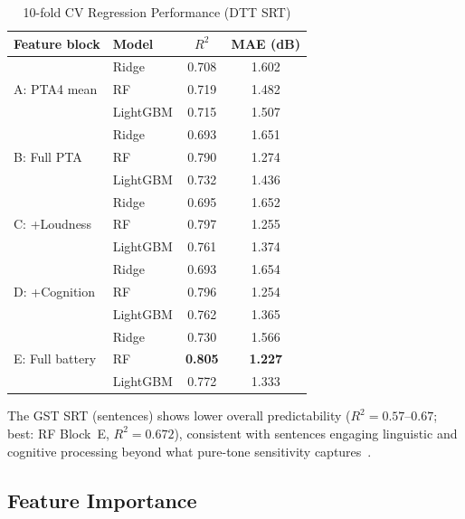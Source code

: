 \documentclass[conference]{IEEEtran}
\begin{document}
\begin{table}[t]
\caption{10-fold CV Regression Performance (DTT SRT)}
\label{tab:benchmark}
\centering
\begin{tabular}{llcc}
\toprule
Feature block & Model & $R^2$ & MAE (dB) \\
\midrule
\multirow{3}{*}{A: PTA4 mean}
  & Ridge     & 0.708 & 1.602 \\
  & RF        & 0.719 & 1.482 \\
  & LightGBM  & 0.715 & 1.507 \\
\midrule
\multirow{3}{*}{B: Full PTA}
  & Ridge     & 0.693 & 1.651 \\
  & RF        & 0.790 & 1.274 \\
  & LightGBM  & 0.732 & 1.436 \\
\midrule
\multirow{3}{*}{C: +Loudness}
  & Ridge     & 0.695 & 1.652 \\
  & RF        & 0.797 & 1.255 \\
  & LightGBM  & 0.761 & 1.374 \\
\midrule
\multirow{3}{*}{D: +Cognition}
  & Ridge     & 0.693 & 1.654 \\
  & RF        & 0.796 & 1.254 \\
  & LightGBM  & 0.762 & 1.365 \\
\midrule
\multirow{3}{*}{E: Full battery}
  & Ridge     & 0.730 & 1.566 \\
  & RF        & \textbf{0.805} & \textbf{1.227} \\
  & LightGBM  & 0.772 & 1.333 \\
\bottomrule
\end{tabular}
\end{table}

The GST SRT (sentences) shows lower overall predictability
($R^2 = 0.57$--$0.67$; best: RF Block~E, $R^2=0.672$), consistent
with sentences engaging linguistic and cognitive processing beyond what
pure-tone sensitivity captures~\cite{Ng2015CognitionSIN}.

\subsection{Feature Importance}
\end{document}
